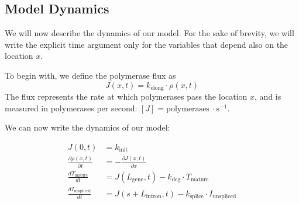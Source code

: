 \documentclass[11pt]{article}
\begin{document}
    \subsection{Model Dynamics}
    We will now describe the dynamics of our model. For the sake of brevity, we will write the explicit time argument only for the variables that depend also on the location $x$.
    
    To begin with, we define the polymerase flux as 
    \begin{equation} \label{eq:flux_def}
    J(x,t) = k_{\mathrm{elong}} \cdot \rho(x,t)
    \end{equation}
    The flux represents the rate at which polymerases pass the location $x$, and is measured in polymerases per second: $\left[ J \right] = \mathrm{polymerases}\ \cdot \mathrm{s}^{-1}$.
    
    We can now write the dynamics of our model:
    
    \begin{tcolorbox}[
    	colback=white, colframe=black, boxrule=0.4pt, arc=1pt,
    	title=Model dynamics, fonttitle=\bfseries\small,
    	coltitle=black, colbacktitle=white, %
    	left=6pt, right=6pt, top=4pt, bottom=4pt,
    	]
    	\begin{subequations}
    	\begin{align}
    		J(0,t) &= k_{\mathrm{init}} \label{eq:initiation}\\
    		\frac{\partial \rho(x,t)}{\partial t} &= -\frac{\partial J(x,t)}{\partial x} \label{eq:elongation}\\
    		\frac{d T_{\mathrm{mature}}}{dt} &= J(L_{\mathrm{gene}},t) - k_{\mathrm{deg}} \cdot T_{\mathrm{mature}} \label{eq:mature}\\
    		\frac{d I_{\mathrm{unspliced}}}{dt} &= J(s+L_{\mathrm{intron}},t) - k_{\mathrm{splice}} \cdot I_{\mathrm{unspliced}} \label{eq:splice}
    	\end{align}
    	\end{subequations}
    	
    \end{tcolorbox}
    
\end{document}
